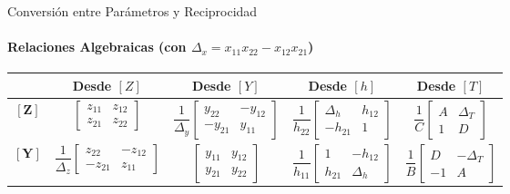 \documentclass[10pt, aspectratio=169]{beamer}
\begin{document}
\begin{frame}{Conversión entre Parámetros y Reciprocidad}
    \framesubtitle{Relaciones Algebraicas (con $\Delta_x = x_{11}x_{22} - x_{12}x_{21}$)}

    \footnotesize
    \renewcommand{\arraystretch}{1.9}
    \begin{center}
        \begin{tabular}{c | c c c c}
                           & \textbf{Desde $[Z]$}                                                                    & \textbf{Desde $[Y]$}                                                                    & \textbf{Desde $[h]$}                                                                 & \textbf{Desde $[T]$}                                                \\
            \hline
            $\mathbf{[Z]}$ & $\begin{bmatrix} z_{11} & z_{12} \\ z_{21} & z_{22} \end{bmatrix}$                      & $\dfrac{1}{\Delta_y}\begin{bmatrix} y_{22} & -y_{12} \\ -y_{21} & y_{11} \end{bmatrix}$ & $\dfrac{1}{h_{22}}\begin{bmatrix} \Delta_h & h_{12} \\ -h_{21} & 1 \end{bmatrix}$    & $\dfrac{1}{C}\begin{bmatrix} A & \Delta_T \\ 1 & D \end{bmatrix}$   \\[0.4cm]
            $\mathbf{[Y]}$ & $\dfrac{1}{\Delta_z}\begin{bmatrix} z_{22} & -z_{12} \\ -z_{21} & z_{11} \end{bmatrix}$ & $\begin{bmatrix} y_{11} & y_{12} \\ y_{21} & y_{22} \end{bmatrix}$                      & $\dfrac{1}{h_{11}}\begin{bmatrix} 1 & -h_{12} \\ h_{21} & \Delta_h \end{bmatrix}$    & $\dfrac{1}{B}\begin{bmatrix} D & -\Delta_T \\ -1 & A \end{bmatrix}$ \\[0.4cm]

\end{tabular}
\end{center}
\end{frame}
\end{document}
